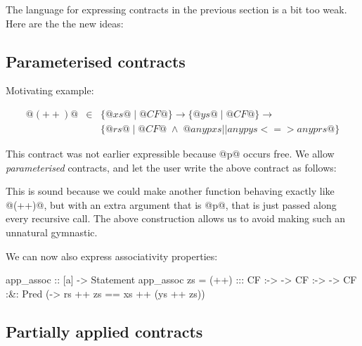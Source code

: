 The language for expressing contracts in the previous section is a bit
too weak. Here are the the new ideas:

\subsection{Parameterised contracts}

Motivating example:

\[\begin{array}{rcl}
@(++)@ & \in & \{ @xs@ \mid @CF@ \} \to \{ @ys@ \mid @CF@ \} \to \\
       &     & \{ @rs@ \mid @CF@ \; \land \; @any p xs || any p ys <=> any p rs@ \}
\end{array}\]

This contract was not earlier expressible because @p@ occurs free. We
allow \emph{parameterised} contracts, and let the user write the above
contract as follows:


This is sound because we could make another function behaving exactly
like @(++)@, but with an extra argument that is @p@, that is just
passed along every recursive call. The above construction allows us
to avoid making such an unnatural gymnastic.


We can now also express associativity properties:

\begin{code}
app_assoc :: [a] -> Statement
app_assoc zs = (++) :::
    CF :-> \xs -> CF :-> \ys -> CF :&: Pred
        (\rs -> rs ++ zs == xs ++ (ys ++ zs))
\end{code}

\subsection{Partially applied contracts}

